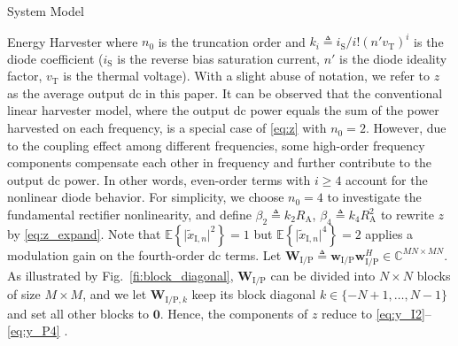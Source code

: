 \begin{section}{System Model}
\begin{subsection}{Energy Harvester}
		where $n_0$ is the truncation order and $k_i \triangleq i_{\mathrm{S}}/i!(n'v_{\mathrm{T}})^i$ is the diode coefficient ($i_{\mathrm{S}}$ is the reverse bias saturation current, $n'$ is the diode ideality factor, $v_{\mathrm{T}}$ is the thermal voltage). With a slight abuse of notation, we refer to $z$ as the average output \gls{dc} in this paper. It can be observed that the conventional linear harvester model, where the output \gls{dc} power equals the sum of the power harvested on each frequency, is a special case of \eqref{eq:z} with $n_0=2$. However, due to the coupling effect among different frequencies, some high-order frequency components compensate each other in frequency and further contribute to the output \gls{dc} power. In other words, even-order terms with $i \ge 4$ account for the nonlinear diode behavior. For simplicity, we choose $n_0=4$ to investigate the fundamental rectifier nonlinearity, and define $\beta_2 \triangleq {k_2}{R_{\mathrm{A}}}$, $\beta_4 \triangleq {k_4}{R_{\mathrm{A}}^2}$ to rewrite $z$ by \eqref{eq:z_expand}. Note that $\mathbb{E}\left\{\lvert\tilde{x}_{\mathrm{I},n}\rvert^2\right\}=1$ but $\mathbb{E}\left\{\lvert\tilde{x}_{\mathrm{I},n}\rvert^4\right\}=2$ applies a modulation gain on the fourth-order \gls{dc} terms. Let $\boldsymbol{W}_{\mathrm{I/P}} \triangleq \boldsymbol{w}_{\mathrm{I/P}}\boldsymbol{w}_{\mathrm{I/P}}^H \in \mathbb{C}^{MN \times MN}$. As illustrated by Fig.~\ref{fi:block_diagonal}, $\boldsymbol{W}_{\mathrm{I/P}}$ can be divided into $N \times N$ blocks of size $M \times M$, and we let $\boldsymbol{W}_{\mathrm{I/P},k}$ keep its block diagonal $k \in \{-N+1,\dots,N-1\}$ and set all other blocks to $\boldsymbol{0}$. Hence, the components of $z$ reduce to \eqref{eq:y_I2}--\eqref{eq:y_P4} \cite{Golub2013}.


\end{subsection}
\end{section}
